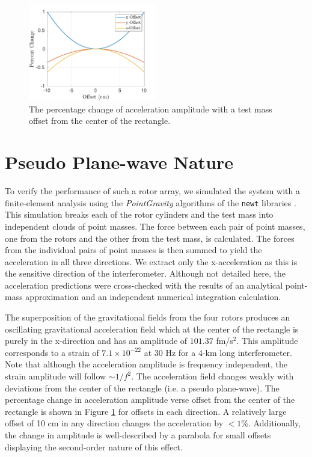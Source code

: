 \documentclass[superscriptaddress, twocolumn, prd]{revtex4-1}
\begin{document}

\begin{figure}[!h]
\centering \includegraphics[width=0.5\textwidth]{Super4_Offset.pdf}
\caption{The percentage change of acceleration amplitude with a test mass offset from the center of the rectangle.}
\label{offset} 
\end{figure}

\section{Pseudo Plane-wave Nature}

To verify the performance of such a rotor array, we simulated the system with a finite-element analysis using the \textit{PointGravity} algorithms of the \texttt{newt} libraries \cite{Hagedorn, pgURL}. This simulation breaks each of the rotor cylinders and the test mass into independent clouds of point masses. The force between each pair of point masses, one from the rotors and the other from the test mass, is calculated. The forces from the individual pairs of point masses is then summed to yield the acceleration in all three directions. We extract only the x-acceleration as this is the sensitive direction of the interferometer. Although not detailed here, the acceleration predictions were cross-checked with the results of an analytical point-mass approximation \cite{ncal} and an independent  numerical integration calculation.

The superposition of the gravitational fields from the four rotors produces an oscillating gravitational acceleration field which at the center of the rectangle is purely in the x-direction and has an amplitude of $101.37$ fm/s$^2$. This amplitude corresponds to a strain of $7.1\times10^{-22}$ at 30 Hz for a 4-km long interferometer. Note that although the acceleration amplitude is frequency independent, the strain amplitude will follow $\sim1/f^2$. The acceleration field changes weakly with deviations from the center of the rectangle (i.e. a pseudo plane-wave). The percentage change in acceleration amplitude verse offset from the center of the rectangle is shown in Figure \ref{offset} for offsets in each direction. A relatively large offset of 10 cm in any direction changes the acceleration by $<1\%$. Additionally, the change in amplitude is well-described by a parabola for small offsets displaying the second-order nature of this effect. 
\end{document}
